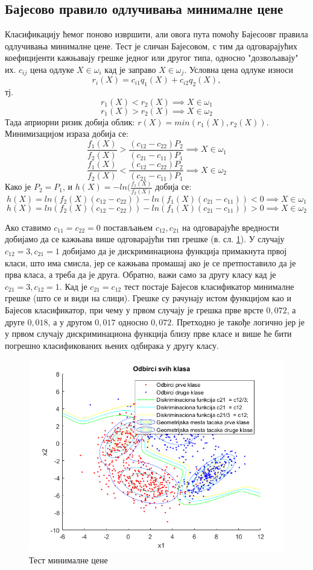 \subsection{Бајесово правило одлучивања минималне цене}
Класификацију ћемог поново извршити, али овога пута помоћу Бајесоовг правила одлучивања минималне цене. Тест је сличан Бајесовом, с тим да одговарајућих коефицијенти кажњавају грешке једног или другог типа, односно "дозвољавају" их. $c_{ij}$ цена одлуке $X \in \omega_i$ кад је заправо $X \in \omega_j$. Условна цена одлуке износи 
$$r_i(X) = c_{i1}q_1(X) + c_{i2}q_2(X),$$ тј.
$$r_1(X) < r_2(X) \implies X \in \omega_1$$
$$r_1(X) > r_2(X) \implies X \in \omega_2$$
Тада априорни ризик добија облик: $r(X) = min(r_1(X), r_2(X))$. Минимизацијом израза добија се:
$$\frac{f_1(X)}{f_2(X)} > \frac{(c_{12}-c_{22})P_2}{(c_{21} - c_{11})P_1} \implies X\in \omega_1$$
$$\frac{f_1(X)}{f_2(X)} < \frac{(c_{12}-c_{22})P_2}{(c_{21} - c_{11})P_1} \implies X\in \omega_2$$
Како је $P_2 = P_1$, и $h(X) = -ln(\frac{f_1(X)}{f_2(X)}$ добија се:
$$h(X) = ln(f_2(X) (c_{12} - c_{22})) - ln(f_1(X)(c_{21} - c_{11})) < 0 \implies X \in \omega_1$$
$$h(X) = ln(f_2(X) (c_{12} - c_{22})) - ln(f_1(X)(c_{21} - c_{11})) >0 \implies X \in \omega_2$$

Ако ставимо  $c_{11} = c_{22} = 0$ постављањем $c_{12}, c_{21}$ на одговарајуће вредности добијамо да се кажњава више одговарајући тип грешке (в. сл. \ref{fig:BayesMinimal}). У случају $c_{12} = 3, c_{21} = 1$ добијамо да је дискриминациона функција примакнута првој класи, што има смисла, јер се кажњава промашај ако је се претпоставило да је прва класа, а треба да је друга. Обратно, важи само за другу класу кад је $c_{21} = 3, c_{12} =1$. Кад је $c_{21}=c_{12}$ тест постаје Бајесов класификатор минималне грешке (што се и види на слици).
Грешке су рачунају истом функцијом као и Бајесов класификатор, при чему у првом случају је грешка прве врсте $0, 072$, а друге $0, 018$, а у другом $0, 017$ односно $0,072$. Претходно је такође логично јер је у првом случају дискриминациона функција близу прве класе и више ће бити погрешно класификованих њених одбирака у другу класу. 


\begin{figure}[htb!]
\centering
\includegraphics[scale=1]{pictures/2/BayesMinimal}
\caption{Тест минималне цене}\label{fig:BayesMinimal}
\end{figure}
